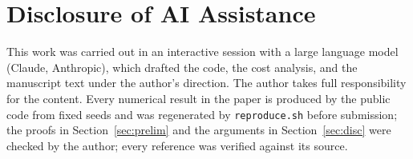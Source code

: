 \documentclass[conference]{IEEEtran}
\begin{document}
\section*{Disclosure of AI Assistance}
This work was carried out in an interactive session with a large language model (Claude, Anthropic), which drafted the code, the cost analysis, and the manuscript text under the author's direction. The author takes full responsibility for the content. Every numerical result in the paper is produced by the public code from fixed seeds and was regenerated by \texttt{reproduce.sh} before submission; the proofs in Section~\ref{sec:prelim} and the arguments in Section~\ref{sec:disc} were checked by the author; every reference was verified against its source.



\end{document}
